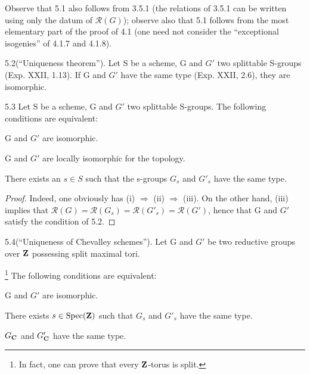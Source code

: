 Observe that 5.1 also follows from 3.5.1 (the relations of 3.5.1 can be written using only the datum of $\mathscr R(G)$); observe also that 5.1 follows from the most elementary part of the proof of 4.1 (one need not consider the ``exceptional isogenies'' of 4.1.7 and 4.1.8).
\begin{corollary}{5.2}\label{XXIII.5.2}\textup{(``Uniqueness theorem'').}
Let S be a scheme, G and $G'$ two splittable S-groups (Exp. XXII, 1.13). If G and $G'$ have the same type (Exp. XXII, 2.6), they are isomorphic.
\end{corollary}
\begin{corollary}{5.3}\label{XXIII.5.3}
Let S be a scheme, G and $G'$ two splittable S-groups. The following conditions are equivalent:
\begin{enumeratei}
\item G and $G'$ are isomorphic.
\item G and $G'$ are locally isomorphic for the \fpqc topology.
\item There exists an $s\in S$ such that the s-groups $G_s$ and $G'_s$ have the same type.
\end{enumeratei}
\end{corollary}
\begin{proof}
Indeed, one obviously has (i) $\Rightarrow$ (ii) $\Rightarrow$ (iii). On the other hand, (iii) implies that $\mathscr R(G)=\mathscr R(G_s)=\mathscr R(G'_s)=\mathscr R(G')$, hence that G and $G'$ satisfy the condition of 5.2.
\end{proof}
\begin{corollary}{5.4}\label{XXIII.5.4}\textup{(``Uniqueness of Chevalley schemes'').}
Let G and $G'$ be two reductive groups over $\mathbf{Z}$ possessing split maximal tori.\begingroup\renewcommand{\thefootnote}{*}\addtocounter{footnote}{-1}\footnote{In fact, one can prove that every $\mathbf{Z}$-torus is split.\begingroup\renewcommand{\thefootnote}{13}\ndemark\endgroup}\endgroup{}
The following conditions are equivalent:
\begin{enumeratei}
\item G and $G'$ are isomorphic.
\item There exists $s\in\operatorname{Spec}(\mathbf{Z})$ such that $G_s$ and $G'_s$ have the same type.
\item $G_{\mathbf{C}}$ and $G'_{\mathbf{C}}$ have the same type.
\end{enumeratei}
\end{corollary}
